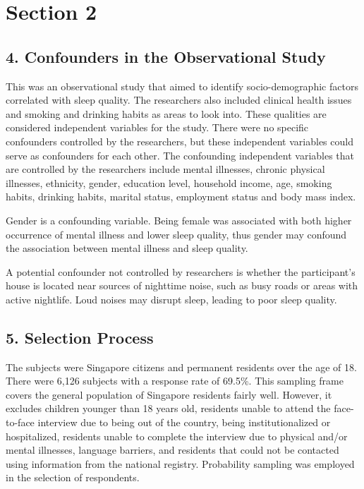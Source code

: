 \section*{Section 2}

\subsection*{4. Confounders in the Observational Study}

This was an observational study that aimed to identify socio-demographic factors correlated with sleep quality. The researchers also included clinical health issues and smoking and drinking habits as areas to look into. These qualities are considered independent variables for the study. There were no specific confounders controlled by the researchers, but these independent variables could serve as confounders for each other. The confounding independent variables that are controlled by the researchers include mental illnesses, chronic physical illnesses, ethnicity, gender, education level, household income, age, smoking habits, drinking habits, marital status, employment status and body mass index.

Gender is a confounding variable. Being female was associated with both higher occurrence of mental illness and lower sleep quality, thus gender may confound the association between mental illness and sleep quality.

A potential confounder not controlled by researchers is whether the participant's house is located near sources of nighttime noise, such as busy roads or areas with active nightlife. Loud noises may disrupt sleep, leading to poor sleep quality.

\subsection*{5. Selection Process}

The subjects were Singapore citizens and permanent residents over the age of 18. There were 6,126 subjects with a response rate of 69.5\%. This sampling frame covers the general population of Singapore residents fairly well. However, it excludes children younger than 18 years old, residents unable to attend the face-to-face interview due to being out of the country, being institutionalized or hospitalized, residents unable to complete the interview due to physical and/or mental illnesses, language barriers, and residents that could not be contacted using information from the national registry. Probability sampling was employed in the selection of respondents.

